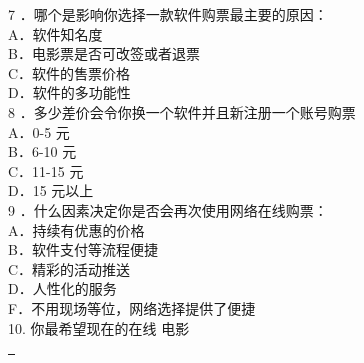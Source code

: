 \documentclass[a4paper]{article}
\begin{document}
7 ．哪个是影响你选择一款软件购票最主要的原因：\\
\ind A．软件知名度\\
\ind B．电影票是否可改签或者退票\\
\ind C．软件的售票价格\\
\ind D．软件的多功能性\\[7pt]
8 ．多少差价会令你换一个软件并且新注册一个账号购票\\
\ind A．0-5 元\\
\ind B．6-10 元\\
\ind C．11-15 元\\
\ind D．15 元以上\\[7pt]
9 ．什么因素决定你是否会再次使用网络在线购票：\\
\ind A．持续有优惠的价格\\
\ind B．软件支付等流程便捷\\
\ind C．精彩的活动推送\\
\ind D．人性化的服务\\
\ind F．不用现场等位，网络选择提供了便捷\\[7pt]
10. 你最希望现在的在线 电影\\
\underline{\hspace{10cm}\ }
\end{document}
